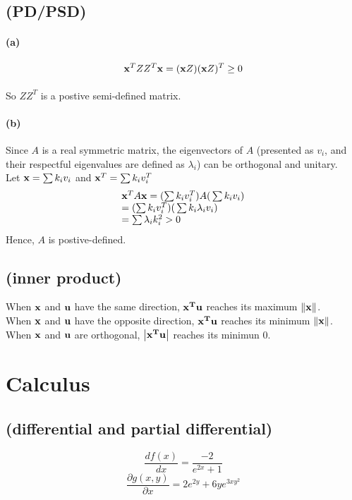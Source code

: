 \documentclass[8pt,a4paper]{exam}
\begin{document}
\subsection{(PD/PSD)}
\paragraph{(a)}
	\[{{\bf{x}}^T}Z{Z^T}{\bf{x}} = ({\bf{x}}Z){({\bf{x}}Z)^T} \ge 0\]
\paragraph{}
So $Z{Z^T}$ is a postive semi-defined matrix.
\paragraph{(b)}
Since $A$ is a real symmetric matrix, the eigenvectors of $A$ (presented as ${v_i}$, and their respectful eigenvalues are defined as ${\lambda _i}$) can be orthogonal and unitary.\\
Let ${\bf{x}} = \sum {{k_i}{v_i}} $ and ${{\bf{x}}^T} = \sum {{k_i}v_i^T} $
\[\begin{array}{l}
{{\bf{x}}^T}A{\bf{x}} = (\sum {{k_i}v_i^T)A(} \sum {{k_i}{v_i}} )\\
= (\sum {{k_i}v_i^T)(} \sum {{k_i}{\lambda _i}{v_i}} )\\
= \sum {{\lambda _i}k_i^2}  > 0
\end{array}\]
\indent Hence, $A$ is postive-defined.
\subsection{(inner product)}
\noindent When $\bf{x}$ and $\bf{u}$ have the same direction, ${\bf{x}^T}\bf{u}$ reaches its maximum $\left\| \bf{x} \right\|$.\\
When $\bf{x}$ and $\bf{u}$ have the opposite direction, ${\bf{x}^T}\bf{u}$ reaches its minimum $\left\| \bf{x} \right\|$.\\
When $\bf{x}$ and $\bf{u}$ are orthogonal, $\left| {{{\bf{x}}^{\bf{T}}}{\bf{u}}} \right|$ reaches its minimun 0.\\
\section{Calculus}
\subsection{(differential and partial differential)}
\[\frac{{df(x)}}{{dx}} = \frac{{ - 2}}{{{e^{2x}} + 1}}\]
\[\frac{{\partial g(x,y)}}{{\partial x}} = 2{e^{2y}} + 6y{e^{3xy^2}}\]
\end{document}

